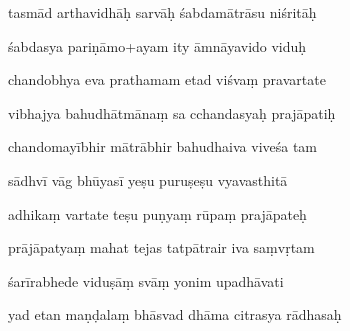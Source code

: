 \documentclass[article,12pt,a4paper]{memoir}%
\newcounter{parCount}
\begin{document}
	  
	  \pstart \leavevmode%
	tasmād arthavidhāḥ sarvāḥ śabdamātrāsu niśritāḥ 
	{}
	\pend%
      

	  
	  \pstart {} śabdasya pariṇāmo+ayam ity āmnāyavido viduḥ 
	{}
	\pend%
      

	  
	  \pstart \leavevmode%
	chandobhya eva prathamam etad viśvaṃ pravartate 
	{}
	\pend%
      

	  
	  \pstart {} vibhajya bahudhātmānaṃ sa cchandasyaḥ prajāpatiḥ 
	{}
	\pend%
      

	  
	  \pstart \leavevmode%
	chandomayībhir mātrābhir bahudhaiva viveśa tam 
	{}
	\pend%
      

	  
	  \pstart {} sādhvī vāg bhūyasī yeṣu puruṣeṣu vyavasthitā 
	{}
	\pend%
      

	  
	  \pstart \leavevmode%
	adhikaṃ vartate teṣu puṇyaṃ rūpaṃ prajāpateḥ 
	{}
	\pend%
      

	  
	  \pstart {} prājāpatyaṃ mahat tejas tatpātrair iva saṃvṛtam 
	{}
	\pend%
      

	  
	  \pstart \leavevmode%
	śarīrabhede viduṣāṃ svāṃ yonim upadhāvati 
	{}
	\pend%
      

	  
	  \pstart {} yad etan maṇḍalaṃ bhāsvad dhāma citrasya rādhasaḥ 
	{}
	\pend%
      
\end{document}
